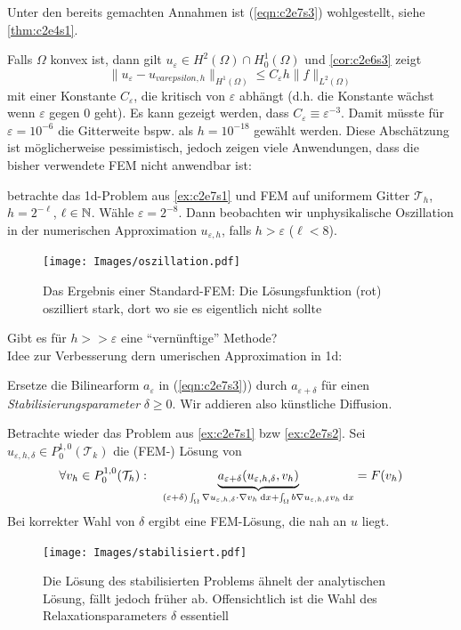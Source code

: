 \documentclass[../skript.tex]{subfiles}
\begin{document}
Unter den bereits gemachten Annahmen ist (\ref{eqn:c2e7s3}) wohlgestellt, siehe \cref{thm:c2e4s1}.\par
Falls $\Omega$ konvex ist, dann gilt $u_\varepsilon\in H^2(\Omega)\cap H^1_0(\Omega)$ und \cref{cor:c2e6s3} zeigt
\[
	\|u_\varepsilon-u_{varepsilon,h}\|_{H^1(\Omega)} \leq C_\varepsilon h\|f\|_{L^2(\Omega)}
\]
mit einer Konstante $C_\varepsilon$, die kritisch von $\varepsilon$ abhängt (d.h. die Konstante wächst wenn $\varepsilon$ gegen 0 geht). Es kann gezeigt werden, dass $C_\varepsilon \equiv \varepsilon^{-3}$. Damit müsste für $\varepsilon = 10^{-6}$ die Gitterweite bspw. als $h = 10^{-18}$ gewählt werden. Diese Abschätzung ist möglicherweise pessimistisch, jedoch zeigen viele Anwendungen, dass die bisher verwendete FEM nicht anwendbar ist:
\begin{example}\label{ex:c2e7s2}
	betrachte das 1d-Problem aus \cref{ex:c2e7s1} und FEM auf uniformem Gitter $\mathcal{T}_h$, $h=2^{-\ell}$, $\ell\in\mathbb{N}$. Wähle $\varepsilon = 2^{-8}$. Dann beobachten wir unphysikalische Oszillation in der numerischen Approximation $u_{\varepsilon,h}$, falls $h > \varepsilon$ ($\ell < 8$).
	\begin{figure}[ht]
	\centering
		\texttt{[image: Images/oszillation.pdf]}
		\caption{Das Ergebnis einer Standard-FEM: Die Lösungsfunktion (rot) oszilliert stark, dort wo sie es eigentlich nicht sollte}
		\label{figure_oszillation}
	\end{figure}
\end{example}
 Gibt es für $h>>\varepsilon$ eine ``vernünftige'' Methode?\\
 Idee zur Verbesserung dern umerischen Approximation in 1d:\par
 Ersetze die Bilinearform $a_\varepsilon$ in (\ref{eqn:c2e7s3})) durch $a_{\varepsilon+\delta}$ für einen \emph{Stabilisierungsparameter} $\delta \geq 0$. Wir addieren also künstliche Diffusion. 
 \begin{example}\label{ex:c2e7s3}
 	Betrachte wieder das Problem aus \cref{ex:c2e7s1} bzw \cref{ex:c2e7s2}. Sei $u_{\varepsilon,h,\delta}\in P^{1,0}_0(\mathcal{T}_k)$ die (FEM-) Lösung von
 	\[
 		\forall v_h\in P^{1,0}_0(\mathcal{T}_h):\quad \underbrace{a_{\varepsilon+\delta}(u_{\varepsilon,h,\delta}, v_h)}_{(\varepsilon+\delta)\int_\Omega\nabla u_{\varepsilon,h,\delta} \cdot\nabla v_h\:\mathrm{d}x + \int_\Omega b\nabla u_{\varepsilon,h,\delta}v_h\:\mathrm{d}x} = F(v_h)
 	\] 
 	Bei korrekter Wahl von $\delta$ ergibt eine FEM-Lösung, die nah an $u$ liegt.
 	\begin{figure}[ht]
 	\centering
 		\texttt{[image: Images/stabilisiert.pdf]}
 		\caption{Die Lösung des stabilisierten Problems ähnelt der analytischen Lösung, fällt jedoch früher ab. Offensichtlich ist die Wahl des Relaxationsparameters $\delta$ essentiell}
 		\label{figure_stabilisiert}
 	\end{figure}
 \end{example}
\end{document}
